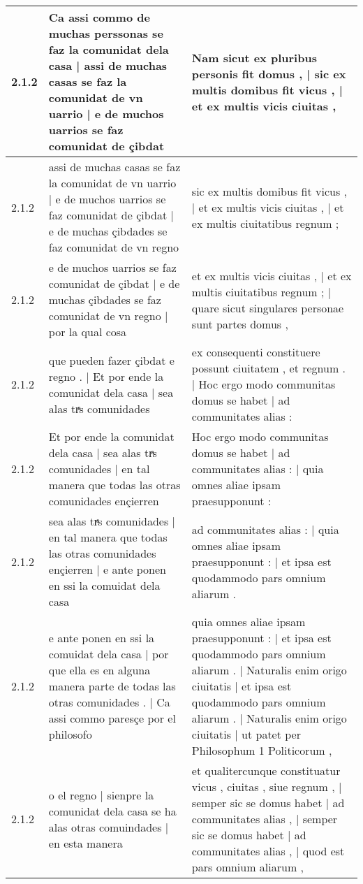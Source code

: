 \begin{tabular}{|p{1cm}|p{6.5cm}|p{6.5cm}|}
2.1.2 & Ca assi commo de muchas perssonas se faz la comunidat dela casa | assi de muchas casas se faz la comunidat de vn uarrio | e de muchos uarrios se faz comunidat de çibdat & Nam sicut ex pluribus personis fit domus , | sic ex multis domibus fit vicus , | et ex multis vicis ciuitas , \\\hline
2.1.2 & assi de muchas casas se faz la comunidat de vn uarrio | e de muchos uarrios se faz comunidat de çibdat | e de muchas çibdades se faz comunidat de vn regno & sic ex multis domibus fit vicus , | et ex multis vicis ciuitas , | et ex multis ciuitatibus regnum ; \\\hline
2.1.2 & e de muchos uarrios se faz comunidat de çibdat | e de muchas çibdades se faz comunidat de vn regno | por la qual cosa & et ex multis vicis ciuitas , | et ex multis ciuitatibus regnum ; | quare sicut singulares personae sunt partes domus , \\\hline
2.1.2 & que pueden fazer çibdat e regno . | Et por ende la comunidat dela casa | sea alas trͣs comunidades & ex consequenti constituere possunt ciuitatem , et regnum . | Hoc ergo modo communitas domus se habet | ad communitates alias : \\\hline
2.1.2 & Et por ende la comunidat dela casa | sea alas trͣs comunidades | en tal manera que todas las otras comunidades ençierren & Hoc ergo modo communitas domus se habet | ad communitates alias : | quia omnes aliae ipsam praesupponunt : \\\hline
2.1.2 & sea alas trͣs comunidades | en tal manera que todas las otras comunidades ençierren | e ante ponen en ssi la comuidat dela casa & ad communitates alias : | quia omnes aliae ipsam praesupponunt : | et ipsa est quodammodo pars omnium aliarum . \\\hline
2.1.2 & e ante ponen en ssi la comuidat dela casa | por que ella es en alguna manera parte de todas las otras comunidades . | Ca assi commo paresçe por el philosofo & quia omnes aliae ipsam praesupponunt : | et ipsa est quodammodo pars omnium aliarum . | Naturalis enim origo ciuitatis | et ipsa est quodammodo pars omnium aliarum . | Naturalis enim origo ciuitatis | ut patet per Philosophum 1 Politicorum , \\\hline
2.1.2 & o el regno | sienpre la comunidat dela casa se ha alas otras comuindades | en esta manera & et qualitercunque constituatur vicus , ciuitas , siue regnum , | semper sic se domus habet | ad communitates alias , | semper sic se domus habet | ad communitates alias , | quod est pars omnium aliarum , \\\hline

\end{tabular}
